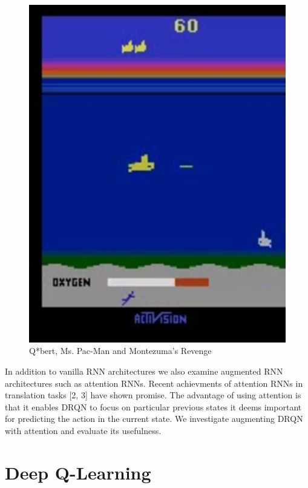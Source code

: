 \documentclass{article}
\begin{document}
\begin{figure}[h]
\begin{minipage}{0.8\textwidth}
            \centering
            \includegraphics[scale=0.15]{Seaquest}
        \end{minipage}
        \caption{Q*bert, Ms. Pac-Man and Montezuma's Revenge}
    \end{figure}

    In addition to vanilla RNN architectures we also examine augmented RNN
    architectures such as attention RNNs. Recent achievments of attention RNNs in
    translation tasks [2, 3] have shown promise. The advantage of using attention
    is that it enables DRQN to focus on particular previous states it deems
    important for predicting the action in the current state. We investigate
    augmenting DRQN with attention and evaluate its usefulness.

\section{Deep Q-Learning}
\end{document}
